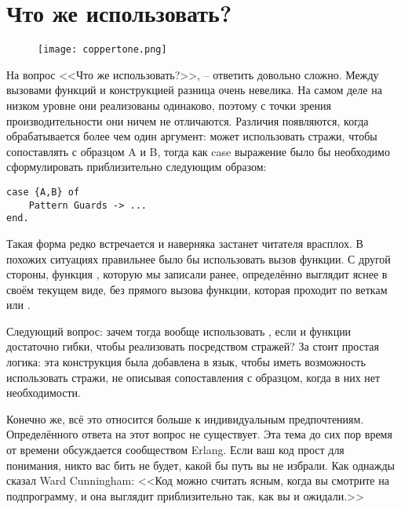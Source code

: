 \section{Что же использовать?}
\begin{figure}[h!]
    \texttt{[image: coppertone.png]}
\end{figure}
На вопрос <<Что же использовать?>>, \--- ответить довольно сложно. Между вызовами функций и конструкцией  разница очень невелика. На самом деле на низком уровне они реализованы одинаково, поэтому с точки зрения производительности они ничем не отличаются. Различия появляются, когда обрабатывается более чем один аргумент:  может использовать стражи, чтобы сопоставлять  с образцом A и B, тогда как case выражение было бы необходимо сформулировать приблизительно следующим образом:
\begin{lstlisting}[style=erlang]
case {A,B} of
    Pattern Guards -> ...
end.
\end{lstlisting}

Такая форма редко встречается и наверняка застанет читателя врасплох. В похожих ситуациях правильнее было бы использовать вызов функции. С другой стороны, функция , которую мы записали ранее, определённо выглядит яснее в своём текущем виде, без прямого вызова функции, которая проходит по веткам  или .

Следующий вопрос: зачем тогда вообще использовать , если  и функции достаточно гибки, чтобы реализовать  посредством стражей? За  стоит простая логика: эта конструкция была добавлена в язык, чтобы иметь возможность использовать стражи, не описывая сопоставления с образцом, когда в них нет необходимости.

Конечно же, всё это относится больше к индивидуальным предпочтениям. Определённого ответа на этот вопрос не существует. Эта тема до сих пор время от времени обсуждается сообществом Erlang. Если ваш код прост для понимания, никто вас бить не будет, какой бы путь вы не избрали. Как однажды сказал Ward Cunningham: <<Код можно считать ясным, когда вы смотрите на подпрограмму, и она выглядит приблизительно так, как вы и ожидали.>>
